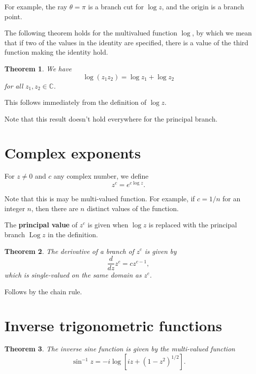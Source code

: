\documentclass[a4paper,10pt]{article}
\newcommand{\C}{\mathbb{C}}
\DeclareMathOperator{\Log}{Log}
\newtheorem{theorem}{Theorem}[section]
\newenvironment{definition}[1][Definition]{\begin{trivlist}
\item[\hskip \labelsep {\bfseries #1}]}{\end{trivlist}}
\begin{document}
For example, the ray $\theta = \pi$ is a branch cut for $\log z$, and the origin is a branch point.

The following theorem holds for the multivalued function $\log$, by which we mean that if two of the values in the identity are specified, there is a value of the third function making the identity hold.

\begin{theorem}
We have
$$\log(z_1z_2) = \log z_1 + \log z_2$$
for all $z_1, z_2 \in \C$.
\end{theorem}

This follows immediately from the definition of $\log z$.

Note that this result doesn't hold everywhere for the principal branch.

\section{Complex exponents}

\begin{definition}
For $z \neq 0$ and $c$ any complex number, we define
$$z^c = e^{c\log z}.$$
\end{definition}

Note that this is may be multi-valued function. For example, if $c = 1/n$ for an integer $n$, then there are $n$ distinct values of the function.

\begin{definition}
The \textbf{principal value} of $z^c$ is given when $\log z$ is replaced with the principal branch $\Log z$ in the definition.
\end{definition}

\begin{theorem}
The derivative of a branch of $z^c$ is given by
$$\frac{d}{dz}z^c = cz^{c - 1},$$
which is single-valued on the same domain as $z^c$.
\end{theorem}

Follows by the chain rule.

\section{Inverse trigonometric functions}

\begin{theorem}
The inverse sine function is given by the multi-valued function
$$\sin^{-1} z = -i\log\left[iz + (1 - z^2)^{1/2}\right].$$
\end{theorem}
\end{document}
